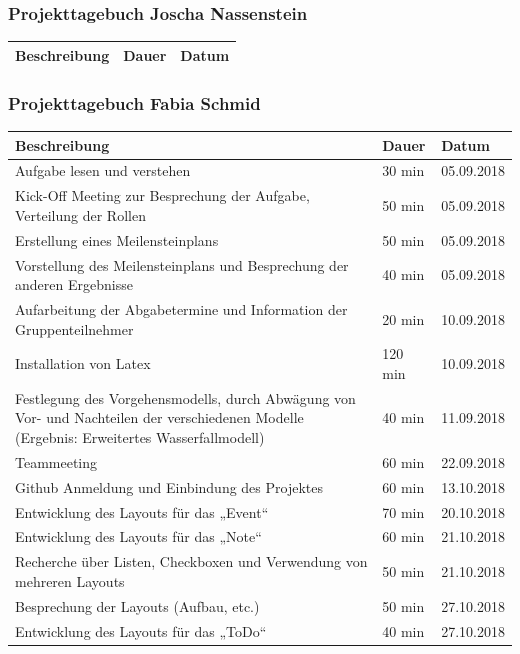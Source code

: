 \newpage
\subsubsection{Projekttagebuch Joscha Nassenstein}
\begin{longtable}{|p{10cm}|p{2cm}|p{2cm}|}
\hline
{\textbf{Beschreibung}} & {\textbf{Dauer}} & {\textbf{Datum}} \\ \hline

\end{longtable}

\newpage
\subsubsection{Projekttagebuch Fabia Schmid}
\begin{longtable}{|p{10cm}|p{2cm}|p{2cm}|}
\hline
{\textbf{Beschreibung}} & {\textbf{Dauer}} & {\textbf{Datum}} \\ \hline
Aufgabe lesen und verstehen & 30 min & 05.09.2018 \\ \hline
Kick-Off Meeting zur Besprechung der Aufgabe, Verteilung der Rollen & 50 min & 05.09.2018 \\ \hline
Erstellung eines Meilensteinplans & 50 min & 05.09.2018 \\ \hline
Vorstellung des Meilensteinplans und Besprechung der anderen Ergebnisse & 40 min & 05.09.2018 \\ \hline
Aufarbeitung der Abgabetermine und Information der Gruppenteilnehmer  & 20 min & 10.09.2018 \\ \hline
Installation von Latex & 120 min & 10.09.2018 \\ \hline
Festlegung des Vorgehensmodells, durch Abwägung von Vor- und Nachteilen der verschiedenen Modelle (Ergebnis: Erweitertes Wasserfallmodell)
 & 40 min & 11.09.2018 \\ \hline
Teammeeting & 60 min & 22.09.2018 \\ \hline
Github Anmeldung und Einbindung des Projektes & 60 min & 13.10.2018 \\ \hline
Entwicklung des Layouts für das „Event“  & 70 min & 20.10.2018 \\ \hline
Entwicklung des Layouts für das „Note“ & 60 min & 21.10.2018 \\ \hline
Recherche über Listen, Checkboxen und Verwendung von mehreren Layouts & 50 min & 21.10.2018 \\ \hline
Besprechung der Layouts (Aufbau, etc.) & 50 min & 27.10.2018 \\ \hline
Entwicklung des Layouts für das „ToDo“ & 40 min & 27.10.2018 \\ \hline

\end{longtable}
